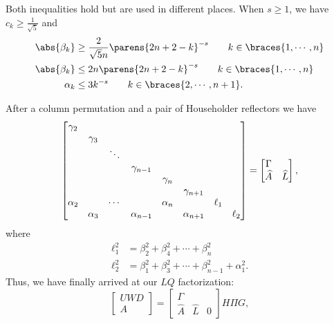 %
Both inequalities hold but are used in different places.
When $s\ge1$, we have $c_{k}\ge\frac{1}{\sqrt{5}}$ and
%
\begin{align}
    \abs{\beta_{k}} &\ge \frac{2}{\sqrt{5}n}\parens{2n+2-k}^{-s} \qquad
        k\in\braces{1,\cdots,n} \nonumber\\
    \abs{\beta_{k}} &\le 2n\parens{2n+2-k}^{-s} \qquad
        k\in\braces{1,\cdots,n} \nonumber\\
    \alpha_{k} &\le 3k^{-s} \qquad k\in\braces{2,\cdots,n+1}.
    \label{eq:birkhoff_bdy_alpha_beta_bounds}
\end{align}



After a column permutation and a pair of Householder reflectors we have
%
\begin{equation}
    \setcounter{MaxMatrixCols}{20}
    \begin{bmatrix}
        \gamma_{2} & \\
        & \gamma_{3} & \\
        & & \ddots & \\
        & & & \gamma_{n-1} \\
        & & & & \gamma_{n} \\
        & & & & & \gamma_{n+1} \\
        \alpha_{2} & & \cdots & & \alpha_{n} & & \ell_{1} \\
        & \alpha_{3} & & \alpha_{n-1} & & \alpha_{n+1} &
            & \ell_{2} \\
    \end{bmatrix}
        = \begin{bmatrix} \Gamma & \\ \widehat{A} & \widehat{L} \end{bmatrix},
\end{equation}
%
where
%
\begin{align}
    \ell_{1}^{2} &= \beta_{2}^{2} + \beta_{4}^{2} + \cdots + \beta_{n}^{2}
        \nonumber\\
    \ell_{2}^{2} &= \beta_{1}^{2} + \beta_{3}^{2} + \cdots + \beta_{n-1}^{2}
            + \alpha_{1}^{2}.
\end{align}
%
Thus, we have finally arrived at our $LQ$ factorization:
%
\begin{equation}
    \begin{bmatrix} UWD \\ A \end{bmatrix} = 
        \begin{bmatrix} \Gamma & & \\ \widehat{A} & \widehat{L} & 0
        \end{bmatrix} H\Pi G,
\end{equation}
